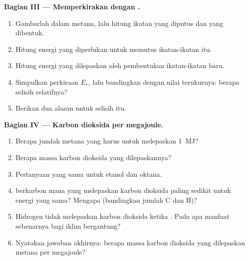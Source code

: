 \begin{problem}
\medskip
\noindent\textbf{Bagian III --- Memperkirakan dengan .}
\begin{enumerate}[resume]
  \item Gambarlah   dalam  metana,
        lalu hitung ikatan yang diputus dan yang dibentuk.
  \item Hitung energi yang diperlukan untuk memutus ikatan-ikatan itu.
  \item Hitung energi yang dilepaskan oleh pembentukan ikatan-ikatan
        baru.
  \item Simpulkan perkiraan $E_r$, lalu bandingkan dengan nilai
        terukurnya: berapa selisih relatifnya?
  \item Berikan dua alasan untuk selisih itu.
\end{enumerate}

\medskip
\noindent\textbf{Bagian IV --- Karbon dioksida per megajoule.}
\begin{enumerate}[resume]
  \item Berapa jumlah metana yang harus  untuk melepaskan
        \qty{1}{MJ}?
  \item Berapa massa karbon dioksida yang dilepaskannya?
  \item Pertanyaan yang sama untuk etanol dan oktana.
  \item {} berkarbon mana yang melepaskan karbon dioksida
        paling sedikit untuk energi yang sama? Mengapa (bandingkan jumlah
         C dan H)?
  \item Hidrogen tidak melepaskan karbon dioksida ketika . Pada
        apa manfaat sebenarnya bagi iklim bergantung?
  \item Nyatakan jawaban akhirnya: berapa massa karbon dioksida yang
        dilepaskan metana per megajoule?
\end{enumerate}
\end{problem}
